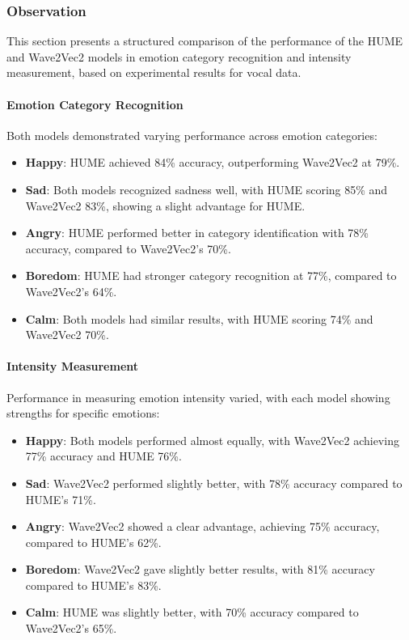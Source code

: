 \subsubsection*{Observation}

This section presents a structured comparison of the performance of the HUME and Wave2Vec2 models in emotion category recognition and intensity measurement, based on experimental results for vocal data.

\paragraph*{Emotion Category Recognition}
Both models demonstrated varying performance across emotion categories:
\begin{itemize}
    \item \textbf{Happy}: HUME achieved 84\% accuracy, outperforming Wave2Vec2 at 79\%.
    \item \textbf{Sad}: Both models recognized sadness well, with HUME scoring 85\% and Wave2Vec2 83\%, showing a slight advantage for HUME.
    \item \textbf{Angry}: HUME performed better in category identification with 78\% accuracy, compared to Wave2Vec2’s 70\%.
    \item \textbf{Boredom}: HUME had stronger category recognition at 77\%, compared to Wave2Vec2’s 64\%.
    \item \textbf{Calm}: Both models had similar results, with HUME scoring 74\% and Wave2Vec2 70\%.
\end{itemize}

\paragraph*{Intensity Measurement}
Performance in measuring emotion intensity varied, with each model showing strengths for specific emotions:
\begin{itemize}
    \item \textbf{Happy}: Both models performed almost equally, with Wave2Vec2 achieving 77\% accuracy and HUME 76\%.
    \item \textbf{Sad}: Wave2Vec2 performed slightly better, with 78\% accuracy compared to HUME’s 71\%.
    \item \textbf{Angry}: Wave2Vec2 showed a clear advantage, achieving 75\% accuracy, compared to HUME’s 62\%.
    \item \textbf{Boredom}: Wave2Vec2 gave slightly better results, with 81\% accuracy compared to HUME’s 83\%.
    \item \textbf{Calm}: HUME was slightly better, with 70\% accuracy compared to Wave2Vec2’s 65\%.
\end{itemize}


